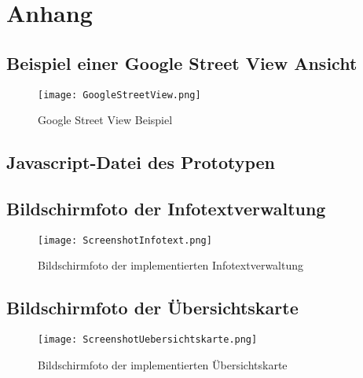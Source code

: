 \section{Anhang}
\label{sec:Anhang}


\subsection{Beispiel einer Google Street View Ansicht}
\label{sec:BeispielEinerGoogleStreetViewAnsicht}

\begin{figure}[htb]
\centering
\texttt{[image: GoogleStreetView.png]}
\caption[Google Street View Beispiel]{Google Street View Beispiel\protect\footnotemark}
\label{fig:GoogleStreetViewBeispiel}
\end{figure}


\subsection{Javascript-Datei des Prototypen}
\label{sec:AnhangJavascriptPrototyp}




\subsection{Bildschirmfoto der Infotextverwaltung}
\label{sec:BildschirmfotoInfotextverwaltung}

\begin{figure}[htb]
\texttt{[image: ScreenshotInfotext.png]}
\caption[Bildschirmfoto Infotexte]{Bildschirmfoto der implementierten Infotextverwaltung}
\label{fig:ScreenshotInfotext}
\end{figure}
\centering

\subsection{Bildschirmfoto der Übersichtskarte}
\label{sec:BildschirmfotoUebersichtskarte}

\begin{figure}[htb]
\texttt{[image: ScreenshotUebersichtskarte.png]}
\caption[Bildschirmfoto Übersichtskarte]{Bildschirmfoto der implementierten Übersichtskarte}
\label{fig:ScreenshotUebersichtskarte}
\end{figure}
\centering
